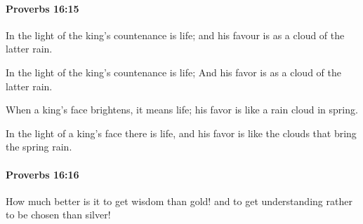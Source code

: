 		\paragraph{Proverbs 16:15} %
			\label{PROVERBS-16-15}

			In the light of the king’s countenance is life; and his favour is as a cloud of the latter rain.

			\begin{versebox}
					\item[BHS] 
					\item[ASV] In the light of the king's countenance is life; And his favor is as a cloud of the latter rain.
					\item[NIV] When a king’s face brightens, it means life; his favor is like a rain cloud in spring.
					\item[NRSV] In the light of a king’s face there is life, and his favor is like the clouds that bring the spring rain.
			\end{versebox}

		\paragraph{Proverbs 16:16} %
			\label{PROVERBS-16-16}

			How much better is it to get wisdom than gold! and to get understanding rather to be chosen than silver!

